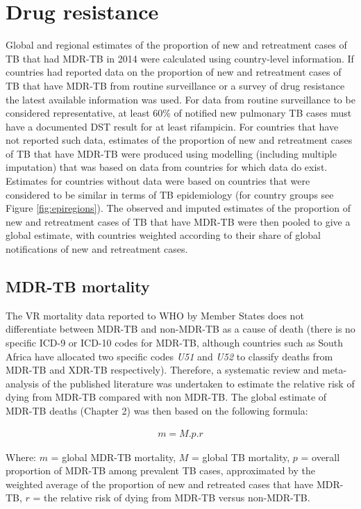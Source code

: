 \section{Drug resistance}

Global and regional estimates of the proportion of new and retreatment cases of TB that had MDR-TB in 2014 were calculated using country-level information. If countries had reported data on the proportion of new and retreatment cases of TB that have MDR-TB from routine surveillance or a survey of drug resistance the latest available information was used. For data from routine surveillance to be considered representative, at least 60\% of notified new pulmonary TB cases must have a documented DST result for at least rifampicin. For countries that have not reported such data, estimates of the proportion of new and retreatment cases of TB that have MDR-TB were produced using modelling (including multiple imputation) that was based on data from countries for which data do exist. Estimates for countries without data were based on countries that were considered to be similar in terms of TB epidemiology (for country groups see Figure \ref{fig:epiregions}). The observed and imputed estimates of the proportion of new and retreatment cases of TB that have MDR-TB were then pooled to give a global estimate, with countries weighted according to their share of global notifications of new and retreatment cases.

\subsection{MDR-TB mortality}

The VR mortality data reported to WHO by Member States does not differentiate between MDR-TB and non-MDR-TB as a cause of death (there is no specific ICD-9 or ICD-10 codes for MDR-TB, although countries such as South Africa have allocated two specific codes \textit{U51} and \textit{U52} to classify deaths from MDR-TB and XDR-TB respectively). Therefore, a systematic review and meta-analysis of the published literature was undertaken to estimate the relative risk of dying from MDR-TB compared with non MDR-TB. The global estimate of MDR-TB deaths (Chapter 2) was then based on the following formula: 

\begin{align*}
m = M.p.r
\end{align*}

Where:
$m$ = global MDR-TB mortality,
$M$ = global TB mortality,
$p$ = overall proportion of MDR-TB among prevalent TB cases, approximated by the weighted average of the proportion of new and retreated cases that have MDR-TB,
$r$ = the relative risk of dying from MDR-TB versus non-MDR-TB.

